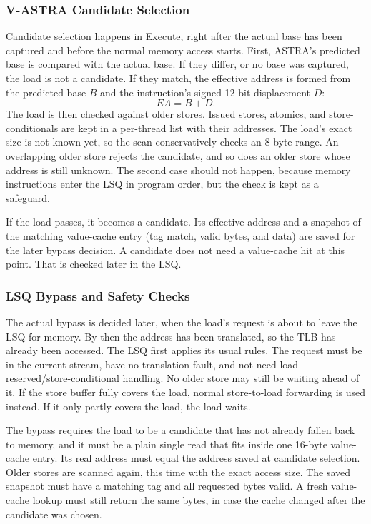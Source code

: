 \subsubsection{V-ASTRA Candidate Selection}

Candidate selection happens in Execute, right after the actual base
has been captured and before the normal memory access starts. First,
ASTRA's predicted base is compared with the actual base. If they
differ, or no base was captured, the load is not a candidate. If they
match, the effective address is formed from the predicted base \(B\)
and the instruction's signed 12-bit displacement \(D\):
\[
    EA = B + D.
\]
The load is then checked against older stores. Issued stores,
atomics, and store-conditionals are kept in a per-thread list with
their addresses. The load's exact size is not known yet, so the scan
conservatively checks an 8-byte range. An overlapping older store
rejects the candidate, and so does an older store whose address is
still unknown. The second case should not happen, because memory
instructions enter the LSQ in program order, but the check is kept as
a safeguard.

If the load passes, it becomes a candidate. Its effective address and
a snapshot of the matching value-cache entry (tag match, valid bytes,
and data) are saved for the later bypass decision. A candidate does
not need a value-cache hit at this point. That is checked later in
the LSQ.

\subsubsection{LSQ Bypass and Safety Checks}

The actual bypass is decided later, when the load's request is about
to leave the LSQ for memory. By then the address has been translated,
so the TLB has already been accessed. The LSQ first applies its usual
rules. The request must be in the current stream, have no translation
fault, and not need load-reserved/store-conditional handling. No older
store may still be waiting ahead of it. If the store buffer fully
covers the load, normal store-to-load forwarding is used instead. If
it only partly covers the load, the load waits.

The bypass requires the load to be a candidate that has not already fallen back to memory, and it must
be a plain single read that fits inside one 16-byte value-cache entry.
Its real address must equal the address saved at candidate selection.
Older stores are scanned again, this time with the exact access size.
The saved snapshot must have a matching tag and all requested bytes
valid. A fresh value-cache lookup must still return the same
bytes, in case the cache changed after the candidate was chosen.

